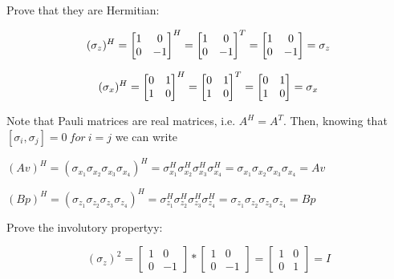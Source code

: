 \documentclass[12pt]{report}
\begin{document}
	
	\begin{minipage}{1 \textwidth}
			Prove that they are Hermitian:\newline
		
		\[
		\text{$( \sigma_z )^{H}$} = 
		\begin{bmatrix}
			1 & 0 \\
			0 & -1
		\end{bmatrix} ^H =
		\begin{bmatrix}
			1 & 0 \\
			0 & -1
		\end{bmatrix}^T =
		\begin{bmatrix}
			1 & 0 \\
			0 & -1
		\end{bmatrix}
		= \text{$ \sigma_z $}
		\]
		
		
		\[
		\text{$( \sigma_x )^{H}$} = 
		\begin{bmatrix}
			0 & 1 \\
			1 & 0
		\end{bmatrix} ^H =
		\begin{bmatrix}
			0 & 1 \\
			1 & 0
		\end{bmatrix}^T =
		\begin{bmatrix}
			0 & 1 \\
			1 & 0
		\end{bmatrix}
		= \text{$ \sigma_x $}
		\]\newline
		
		Note that Pauli matrices are real matrices, i.e. $A^H=A^T$.
		Then, knowing that $[\sigma_i,\sigma_j]=0 \ for \ i=j$ we can write		\newline
		
		\begin{center}
			$(Av)^{H} = (\sigma_{x_1} \sigma_{x_2} \sigma_{x_3} \sigma_{x_4})^{H} = \sigma_{x_1}^H \sigma_{x_2}^H \sigma_{x_3}^H \sigma_{x_4}^H = \sigma_{x_1} \sigma_{x_2} \sigma_{x_3} \sigma_{x_4} = Av$ \newline
			
			$(Bp)^{H} = (\sigma_{z_1} \sigma_{z_2} \sigma_{z_3} \sigma_{z_4})^{H} = \sigma_{z_1}^H \sigma_{z_2}^H \sigma_{z_3}^H \sigma_{z_4}^H = \sigma_{z_1} \sigma_{z_2} \sigma_{z_3} \sigma_{z_4} = Bp$\newline
		\end{center}
		
		Prove the involutory propertyy:\newline
		
		\[
		\text{$( \sigma_z )^{2}$} = 
		\begin{bmatrix}
			1 & 0 \\
			0 & -1
		\end{bmatrix} *
		\begin{bmatrix}
			1 & 0 \\
			0 & -1
		\end{bmatrix} =
		\begin{bmatrix}
			1 & 0 \\
			0 & 1
		\end{bmatrix}
		= \text{$I$}
		\]
		

\end{minipage}
\end{document}

